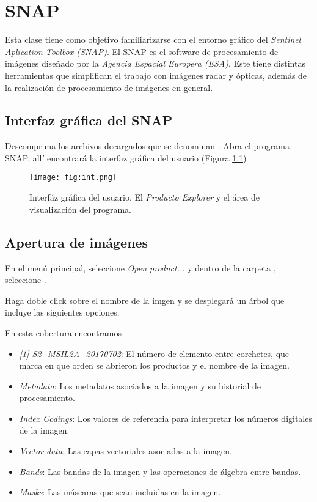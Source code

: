 \chapter{SNAP}

Esta clase tiene como objetivo familiarizarse con el entorno gráfico del \emph{Sentinel Aplication Toolbox (SNAP)}. El SNAP es el software de procesamiento de imágenes diseñado por la \emph{Agencia Espacial Europera (ESA)}. Este tiene distintas herramientas que simplifican el trabajo con imágenes radar y ópticas, además de la realización de procesamiento de imágenes en general.

\section{Interfaz gráfica del SNAP}

Descomprima los archivos decargados que se denominan . Abra el programa SNAP, allí encontrará la interfaz gráfica del usuario (Figura \ref{fig:int})

\begin{figure}[h!]
    \centering
    \texttt{[image: fig:int.png]}
    \caption{Interfáz gráfica del usuario. El \emph{Producto Explorer} y el área de visualización del programa.}
    \label{fig:int}
\end{figure}

\section{Apertura de imágenes}

En el menú principal, seleccione \emph{Open product...} y dentro de la carpeta , seleccione .

Haga doble click sobre el nombre de la imgen y se desplegará un árbol que incluye las siguientes opciones:

En esta cobertura encontramos

\begin{itemize}
    \item \emph{[1] S2\_MSIL2A\_20170702}: El número de elemento entre corchetes, que marca en que orden se abrieron los productos y el nombre de la imagen.
    \item \emph{Metadata}: Los metadatos asociados a la imagen y su historial de procesamiento.
    \item \emph{Index Codings}: Los valores de referencia para interpretar los números digitales de la imagen.
    \item \emph{Vector data}: Las capas vectoriales asociadas a la imagen.
    \item \emph{Bands}: Las bandas de la imagen y las operaciones de álgebra entre bandas.
    \item \emph{Masks}: Las máscaras que sean incluidas en la imagen.
\end{itemize}

